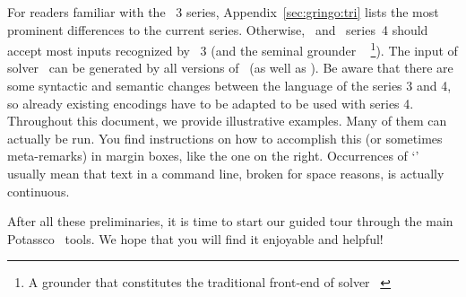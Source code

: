 For readers familiar with the \gringo~3 series, Appendix~\ref{sec:gringo:tri}
lists the most prominent differences to the current series.
Otherwise, \gringo\ and \clingo\ series~4 should accept most inputs recognized by \gringo~3 (and the seminal grounder \lparse~\cite{lparseManual}%
\footnote{A grounder that constitutes the traditional front-end of solver \smodels~\cite{siniso02a}}).
The input of solver \clasp\ can be generated by all versions of \gringo\ (as well as \lparse).
Be aware that there are some syntactic and semantic changes between the language of the series 3 and 4,
so already existing encodings have to be adapted to be used with series 4.
Throughout this document, we provide illustrative examples.
Many of them can actually be run. 
You find instructions on how to accomplish this
(or sometimes meta-remarks)
in margin boxes, like the one on the right.
Occurrences of `'
usually mean that text in a command line, broken for space reasons, is actually continuous.

After all these preliminaries, it is time to start our guided tour
through the main Potassco~\cite{potassco} tools.
We hope that you will find it enjoyable and helpful!


